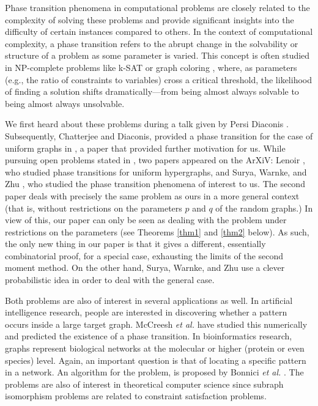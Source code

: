 \documentclass[reqno]{amsart}
\theoremstyle{theorem}
\theoremstyle{definition}
\theoremstyle{remark}
\newcommand{\1}{{\text{\Large $\mathfrak 1$}}}	%
\numberwithin{equation}{section}
\begin{document}
Phase transition phenomena in computational problems are closely related to
the complexity of solving these problems and provide significant insights into
the difficulty of certain instances compared to others. In the context of
computational complexity, a phase transition refers to the abrupt change in the
solvability or structure of a problem as some parameter is varied. This concept
is often studied in NP-complete problems like k-SAT \cite{COP2016} or
graph coloring \cite{AN2005}, where, as parameters                                
(e.g., the ratio of constraints to variables) cross a critical
threshold, the likelihood of finding a solution shifts dramatically—from being
almost always solvable to being almost always unsolvable.


We first heard about these problems during a talk given by
Persi Diaconis \cite{OWPS}. Subsequently, Chatterjee and Diaconis,
provided a phase transition for the case of uniform graphs in \cite{ChD23},
a paper that provided further motivation for us.
While pursuing open problems stated in \cite{ChD23},
two papers appeared on the ArXiV:
Lenoir \cite{L2024}, who studied phase transitions for
uniform hypergraphs, and 
Surya, Warnke, and Zhu \cite{SWZ2023}, who studied
the phase transition phenomena of interest to us. 
The second paper deals with precisely the same problem as ours in a more general
context (that is, without restrictions on the parameters $p$ and $q$ of the
random graphs.)
In view of this, our paper can only be seen as dealing with the problem under
restrictions on the parameters (see Theorems \ref{thm1} and \ref{thm2} below).
As such, the only new thing in our paper is that it gives a different, essentially
combinatorial proof, for a special case,
exhausting the limits of the second moment method.
On the other hand, Surya, Warnke, and Zhu use a clever probabilistic idea
in order to deal with the general case.



Both problems are also of interest in several applications as well.
In artificial intelligence research,
people are interested in discovering whether a pattern occurs
inside a large target graph. McCreesh {\em et al.} \cite{AIpaper18}
have studied this numerically and predicted the 
existence of a phase transition. 
In bioinformatics research, graphs represent biological networks at
the molecular or higher (protein or even species) level.
Again, an important question is that of locating a specific
pattern in a network. An algorithm for the problem, is proposed by
Bonnici {\em et al.} \cite{BIOpaper13}.
The problems are also of interest in theoretical computer science
since subraph isomorphism problems are related to constraint
satisfaction problems. 
\end{document}
